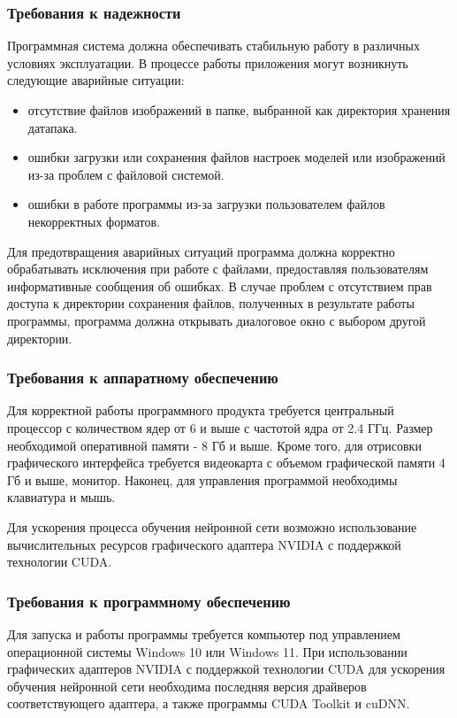 \subsubsection{Требования к надежности}

Программная система должна обеспечивать стабильную работу в различных условиях эксплуатации. В процессе работы приложения могут возникнуть следующие аварийные ситуации:
\begin{itemize}
	\item отсутствие файлов изображений в папке, выбранной как директория хранения датапака.
	\item ошибки загрузки или сохранения файлов настроек моделей или изображений из-за проблем с файловой системой.
	\item ошибки в работе программы из-за загрузки пользователем файлов некорректных форматов.
\end{itemize} 

Для предотвращения аварийных ситуаций программа должна корректно обрабатывать исключения при работе с файлами, предоставляя пользователям информативные сообщения об ошибках. В случае проблем с отсутствием прав доступа к  директории сохранения файлов, полученных в результате работы программы, программа должна открывать диалоговое окно с выбором другой директории.

\subsubsection{Требования к аппаратному обеспечению}

Для корректной работы программного продукта требуется центральный процессор с количеством ядер от 6 и выше с частотой ядра от 2.4 ГГц. Размер необходимой оперативной памяти - 8 Гб и выше. Кроме того, для отрисовки графического интерфейса требуется видеокарта с объемом графической памяти 4 Гб и выше, монитор. Наконец, для управления программой необходимы клавиатура и мышь.

Для ускорения процесса обучения нейронной сети возможно использование вычислительных ресурсов графического адаптера NVIDIA с поддержкой технологии CUDA. 

\subsubsection{Требования к программному обеспечению}

Для запуска и работы программы требуется компьютер под управлением операционной системы Windows 10 или Windows 11. При использовании графических адаптеров NVIDIA с поддержкой технологии CUDA для ускорения обучения нейронной сети необходима последняя версия драйверов соответствующего адаптера, а также программы CUDA Toolkit и cuDNN.

